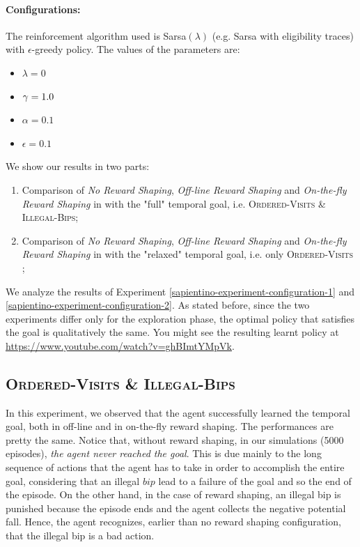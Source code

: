 \paragraph{Configurations:}
The reinforcement algorithm used is Sarsa$(\lambda)$ (e.g. Sarsa with eligibility traces) with $\epsilon$-greedy policy. The values of the parameters are:
\begin{itemize}
	\item $\lambda = 0$
	\item $\gamma=1.0$	
	\item $\alpha=0.1$
	\item $\epsilon= 0.1$
\end{itemize}

\medskip


We show our results in two parts:
\begin{enumerate}
	\item Comparison of \emph{No Reward Shaping}, \emph{Off-line Reward Shaping} and \emph{On-the-fly Reward Shaping} in \Sapientino with the "full" temporal goal, i.e. \textsc{Ordered-Visits \& Illegal-Bips}\label{sapientino-experiment-configuration-1};
	\item Comparison of \emph{No Reward Shaping}, \emph{Off-line Reward Shaping} and \emph{On-the-fly Reward Shaping} in \Sapientino with the "relaxed" temporal goal, i.e. only \textsc{Ordered-Visits} \label{sapientino-experiment-configuration-2};
\end{enumerate}


We analyze the results of Experiment \ref{sapientino-experiment-configuration-1} and \ref{sapientino-experiment-configuration-2}. As stated before, since the two experiments differ only for the exploration phase, the optimal policy that satisfies the goal is qualitatively the same. You might see the resulting learnt policy at \url{https://www.youtube.com/watch?v=ghBImtYMpVk}.

\subsection{\textsc{Ordered-Visits \& Illegal-Bips}}
In this experiment, we observed that the agent successfully learned the temporal goal, both in off-line and in on-the-fly reward shaping. The performances are pretty the same. Notice that, without reward shaping, in our simulations (5000 episodes), \emph{the agent never reached the goal}.
This is due mainly to the long sequence of actions that the agent has to take in order to accomplish the entire goal, considering that an illegal $bip$ lead to a failure of the goal and so the end of the episode. On the other hand, in the case of reward shaping, an illegal bip is punished because the episode ends and the agent collects the negative potential fall. Hence, the agent recognizes, earlier than no reward shaping configuration, that the illegal bip is a bad action.
